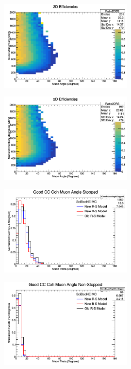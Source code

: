 \documentclass[11pt]{article}
\begin{document}
\begin{figure}[H]
\centering
\includegraphics[width=0.6\textwidth]{NMCombinedPlotsImages/8-NMCombinedPlots.png}
\caption{}
\end{figure}

\begin{figure}[H]
\centering
\includegraphics[width=0.6\textwidth]{NMCombinedPlotsImages/9-NMCombinedPlots.png}
\caption{}
\end{figure}

\begin{figure}[H]
\centering
\includegraphics[width=0.6\textwidth]{NMCombinedPlotsImages/10-NMCombinedPlots.png}
\caption{}
\end{figure}

\begin{figure}[H]
\centering
\includegraphics[width=0.6\textwidth]{NMCombinedPlotsImages/11-NMCombinedPlots.png}
\caption{}
\end{figure}
\end{document}
